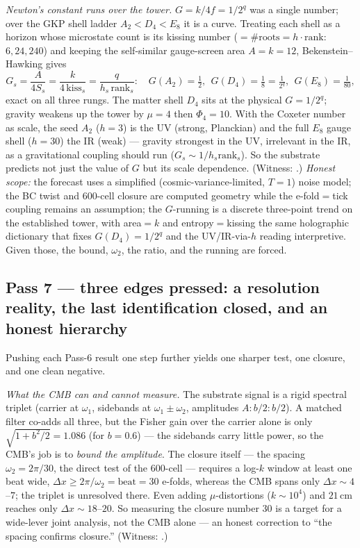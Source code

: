 \documentclass[11pt]{article}
\begin{document}
\emph{Newton's constant runs over the tower.} $G=k/4f=1/2^q$ was a single number; over
the GKP shell ladder $A_2<D_4<E_8$ it is a curve. Treating each shell as a horizon whose
microstate count is its kissing number ($=\#\text{roots}=h\cdot\mathrm{rank}$: $6,24,240$)
and keeping the self-similar gauge-screen area $A=k=12$, Bekenstein--Hawking gives
\[
G_s=\frac{A}{4S_s}=\frac{k}{4\,\mathrm{kiss}_s}=\frac{q}{h_s\,\mathrm{rank}_s}:\quad
G(A_2)=\tfrac12,\ \ G(D_4)=\tfrac18=\tfrac1{2^q},\ \ G(E_8)=\tfrac1{80},
\]
exact on all three rungs. The matter shell $D_4$ sits at the physical $G=1/2^q$; gravity
weakens up the tower by $\mu=4$ then $\Phi_4=10$. With the Coxeter number as scale, the
seed $A_2$ ($h=3$) is the UV (strong, Planckian) and the full $E_8$ gauge shell ($h=30$)
the IR (weak) --- gravity strongest in the UV, irrelevant in the IR, as a gravitational
coupling should run ($G_s\sim1/h_s\mathrm{rank}_s$). So the substrate predicts not just
the value of $G$ but its scale dependence. (Witness:
.) \emph{Honest scope:} the forecast uses a
simplified (cosmic-variance-limited, $T=1$) noise model; the BC twist and $600$-cell
closure are computed geometry while the e-fold$=$tick coupling remains an assumption; the
$G$-running is a discrete three-point trend on the established tower, with area$=k$ and
entropy$=$kissing the same holographic dictionary that fixes $G(D_4)=1/2^q$ and the
UV/IR-via-$h$ reading interpretive. Given those, the bound, $\omega_2$, the ratio, and
the running are forced.

\subsection{Pass 7 --- three edges pressed: a resolution reality, the last identification closed, and an honest hierarchy}
\label{sec:capstone-edges}

Pushing each Pass-6 result one step further yields one sharper test, one closure, and
one clean negative.

\emph{What the CMB can and cannot measure.} The substrate signal is a rigid spectral
triplet (carrier at $\omega_1$, sidebands at $\omega_1\pm\omega_2$, amplitudes $A:b/2:b/2$).
A matched filter co-adds all three, but the Fisher gain over the carrier alone is only
$\sqrt{1+b^2/2}=1.086$ (for $b=0.6$) --- the sidebands carry little power, so the CMB's
job is to \emph{bound the amplitude}. The closure itself --- the spacing $\omega_2=2\pi/30$,
the direct test of the $600$-cell --- requires a log-$k$ window at least one beat wide,
$\Delta x\ge2\pi/\omega_2=\mathrm{beat}=30$ e-folds, whereas the CMB spans only
$\Delta x\sim4$--$7$; the triplet is unresolved there. Even adding $\mu$-distortions
($k\sim10^4$) and $21$\,cm reaches only $\Delta x\sim18$--$20$. So measuring the closure
number $30$ is a target for a wide-lever joint analysis, not the CMB alone --- an honest
correction to ``the spacing confirms closure.'' (Witness:
.)
\end{document}
